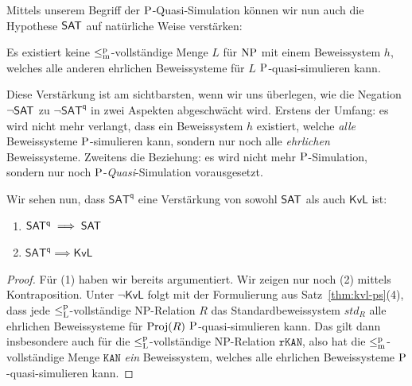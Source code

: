 Mittels unserem Begriff der $\P$-Quasi-Simulation können wir nun auch die Hypothese $\hSAT$ auf natürliche Weise verstärken:
\begin{conjecture}
    Es existiert keine $\leqmp$-vollständige Menge $L$ für $\NP$ mit einem Beweissystem $h$, welches alle anderen ehrlichen Beweissysteme für $L$ $\P$-quasi-simulieren kann. 
\end{conjecture}
Diese Verstärkung ist am sichtbarsten, wenn wir uns überlegen, wie die Negation $\neg\hSAT$ zu $\neg\mathsf{SAT^{q}}$ in zwei Aspekten abgeschwächt wird.
Erstens der Umfang: es wird nicht mehr verlangt, dass ein Beweissystem $h$ existiert, welche \emph{alle} Beweissysteme $\P$-simulieren kann, sondern nur noch alle \emph{ehrlichen} Beweissysteme.
Zweitens die Beziehung: es wird nicht mehr $\P$-Simulation, sondern nur noch $\P$-\emph{Quasi}-Simulation vorausgesetzt.

Wir sehen nun, dass $\mathsf{SAT^{q}}$ eine Verstärkung von sowohl $\hSAT$ als auch $\mathsf{KvL}$ ist:
\begin{corollary}\label{cor:sateff-generalizes-sat}
    \begin{enumerate}
        \item $\mathsf{SAT^{q}}\implies \hSAT$
        \item $\mathsf{SAT^{q}}\implies \mathsf{KvL}$
    \end{enumerate}
\end{corollary}
\begin{proof}
Für (1) haben wir bereits argumentiert. Wir zeigen nur noch (2) mittels Kontraposition. Unter $\neg\mathsf{KvL}$ folgt mit der Formulierung aus Satz~\ref{thm:kvl-ps}(4), dass jede $\leqlp$-vollständige NP-Relation $R$ das Standardbeweissystem $\mathit{std}_R$ alle ehrlichen Beweissysteme für $\Proj(R)$ $\P$-quasi-simulieren kann. Das gilt dann insbesondere auch für die $\leqlp$-vollständige NP-Relation $\mathtt{rKAN}$, also hat die $\leqmp$-vollständige Menge $\mathtt{KAN}$ \emph{ein} Beweissystem, welches alle ehrlichen Beweissysteme $\P$-quasi-simulieren kann.
\end{proof}

